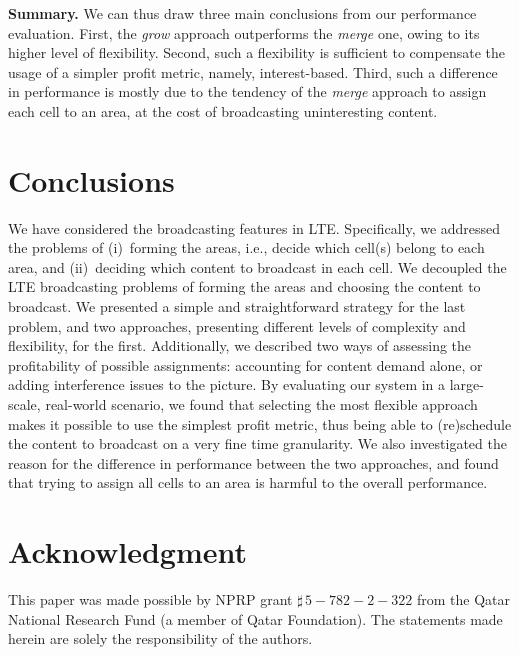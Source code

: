 \documentclass[10pt, conference, compsocconf]{IEEEtran}
\numberwithin{equation}{section}
\begin{document}
\noindent
{\bf Summary.}
We can thus draw three main conclusions from our performance evaluation.
First, the {\em grow} approach outperforms the {\em merge} one, owing to
its higher level of flexibility. Second, such a flexibility is
sufficient to compensate the usage of a simpler profit metric, namely,
interest-based. Third, such a difference in performance is mostly due to
the tendency of the {\em merge} approach to assign each cell to an area,
at the cost of broadcasting uninteresting content.


\section{Conclusions
\label{sec:conclusions}
}

We have considered the broadcasting features in LTE.
Specifically, we
addressed the problems of (i)~forming the areas, i.e., decide which
cell(s) belong to each area, and (ii)~deciding which content to
broadcast in each cell.
We
decoupled the LTE broadcasting problems of forming the areas and choosing the
content to broadcast. We presented a simple and straightforward strategy
for the last problem, and two approaches, presenting different levels of
complexity and flexibility, for the first. 
Additionally, we described two
ways of assessing the profitability of possible assignments:
accounting for content demand alone, or adding interference issues to
the picture.
By evaluating our system in a large-scale, real-world scenario, we
found that selecting the most flexible approach makes it possible to use
the simplest profit metric, thus being able to (re)schedule the content
to broadcast on a very fine time granularity. 
We also investigated the
reason for the difference in performance between the two approaches, and
found that trying to assign all cells to an area is harmful to the
overall performance.

\section*{Acknowledgment}
This paper was made possible by NPRP grant $\sharp\,5-782-2-322$ from the Qatar National Research Fund (a member of Qatar
Foundation). The statements made herein are solely the responsibility of
the authors. 
\end{document}
